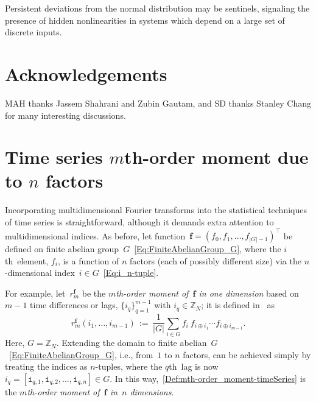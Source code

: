 \documentclass[letterpaper,11pt]{article}
\newcommand{\bs}[1]{{\boldsymbol{#1}}}
\newcommand{\gr}[1]{( #1 )}
\newcommand{\abs}[1]{\vert #1 \vert}
\newcommand{\set}[1]{\{ #1 \}}
\newcommand{\vect}[1]{[ #1 ]}
\newcommand{\Int}{\mathbb Z}
\newcommand{\bcode}[1]{\texttt{#1}}
\newcommand{\ith}{$i$th}
\newcommand{\mth}{$m$th}
\newcommand{\qth}{$q$th}
\theoremstyle{definition} \newtheorem{remark}{Remark}
\begin{document}
Persistent deviations from the normal distribution may be sentinels, signaling the presence of hidden nonlinearities in systems which depend on a large set of discrete inputs.


\section{Acknowledgements}
MAH thanks Jassem Shahrani and Zubin Gautam, and SD thanks Stanley Chang for many interesting discussions.


\appendix
\section{Time series \mth-order moment due to $n$ factors} \label{App:TimeSeries_mthOrderMoment_nDim}
Incorporating multidimensional Fourier transforms into the statistical techniques of time series is straightforward, although it demands extra attention to multidimensional indices. As before, let function~$\bs{f} = \gr{f_0,f_1,\ldots,f_{\abs{G}-1}}^\top$ be defined on finite abelian group~$G$~\eqref{Eq:FiniteAbelianGroup_G}, where the \ith\ element, $f_i$, is a function of $n$ factors (each of possibly different size) via the $n$-dimensional index~$i\in G$~\eqref{Eq:i_n-tuple}.

For example, let~$r_m^\bs{f}$ be the \emph{\mth-order moment of~$\bs{f}$ in one dimension} based on $m-1$ time differences or lags, $\set{i_q}_{q=1}^{m-1}$ with $i_q\in\Int_N$; it is defined in~\cite[Eq.~(3.95)]{nikias1993higher} as
\begin{equation} \label{Def:mth-order_moment-timeSeries}
r_m^\bs{f}\gr{i_1,\ldots,i_{m-1}} \,:=\, \frac{1}{\abs{G}} \sum_{i\in G} f_i \:\! f_{i\oplus i_1} \cdots f_{i\oplus i_{m-1}}.
\end{equation}
Here, $G=\Int_N$. Extending the domain to finite abelian~$G$~\eqref{Eq:FiniteAbelianGroup_G}, i.e., from~$1$ to $n$ factors, can be achieved simply by treating the indices as $n$-tuples, where the \qth\ lag is now $i_q = \vect{\bcode{i}_{q,1},\bcode{i}_{q,2},\ldots,\bcode{i}_{q,n}} \in G$. In this way,~\eqref{Def:mth-order_moment-timeSeries} is the \emph{\mth-order moment of~$\bs{f}$ in~$n$ dimensions}.
\end{document}
